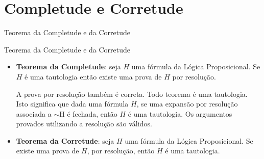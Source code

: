 \section{Completude e Corretude}
\begin{frame}[t]

\vskip 3cm

\begin{center}
{\Huge Teorema da Completude e da Corretude}
\end{center}

\end{frame}

\begin{frame}{Teorema da Completude e da Corretude}

\begin{itemize}

\item \textbf{Teorema da Completude}: seja $H$ uma fórmula da Lógica Proposicional. 
Se $H$ é uma tautologia então existe uma prova de $H$ por resolução.

A prova por resolução também é correta. Todo teorema é uma tautologia. 
Isto significa que dada uma fórmula $H$, se uma expansão por resolução associada 
a $\sim$H é fechada, então $H$ é uma tautologia. Os argumentos provados 
utilizando a resolução são válidos.


\item \textbf{Teorema da Corretude}: seja $H$ uma fórmula da Lógica Proposicional. 
Se existe uma prova de $H$, por resolução, então $H$ é uma tautologia.

\end{itemize}
\end{frame}
